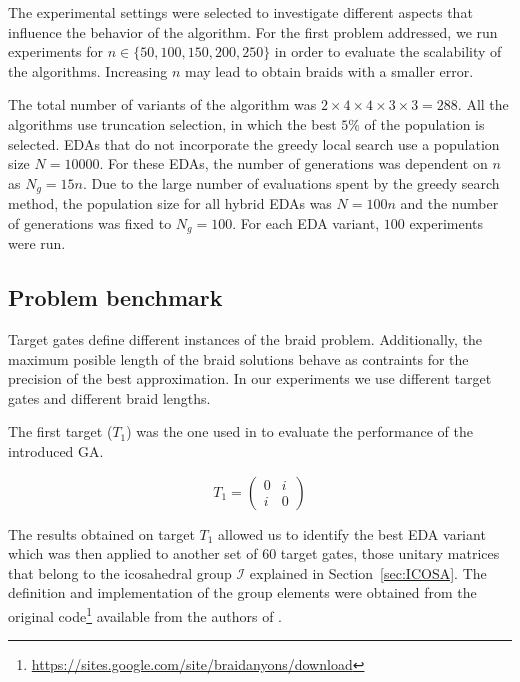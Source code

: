 The experimental settings were selected to investigate different aspects that influence the behavior of the algorithm. For the first problem addressed, we run experiments for $n \in \{50,100,150,200,250\}$ in order to evaluate the scalability of the algorithms. Increasing $n$ may lead to obtain braids with a smaller error. 


The total number of variants of the algorithm was $2 \times 4 \times 4 \times 3 \times 3 = 288$. All the algorithms use truncation selection, in which the best $5\%$ of the population is selected. EDAs that do not incorporate the greedy local search use a population size $N=10000$. For these EDAs, the number of generations  was dependent on $n$ as $N_g = 15n$. Due to the large number of evaluations spent by the greedy search method, the population size for all hybrid EDAs was $N=100n$ and the number of generations was fixed to  $N_g = 100$. For each EDA variant, $100$ experiments were run.  

\subsection{Problem benchmark}

 Target gates define different instances of the braid problem. Additionally, the maximum posible length of the braid solutions behave as contraints for the precision of the best approximation. In our experiments we use different target gates and  different braid lengths. 

 The first target ($T_1$) was the one used in \cite{Mcdonald_and_Katzgraber:2013} to evaluate the performance of the introduced GA. 

\begin{equation}
  T_1 = \left( \begin{array}{cc}
  0   & i  \\
  i & 0   
  \end{array} \right)
\end{equation}

The results obtained on target $T_1$ allowed us to identify the best EDA variant which was then applied to another set of $60$ target gates, those unitary matrices that belong to the icosahedral group $\mathcal{I}$ explained in Section~\ref{sec:ICOSA}. The definition and implementation of the group elements were obtained from the original code\footnote{\url{https://sites.google.com/site/braidanyons/download}} available from the authors of \cite{Burrello_et_al:2010,Burrello_et_al:2011}. 


